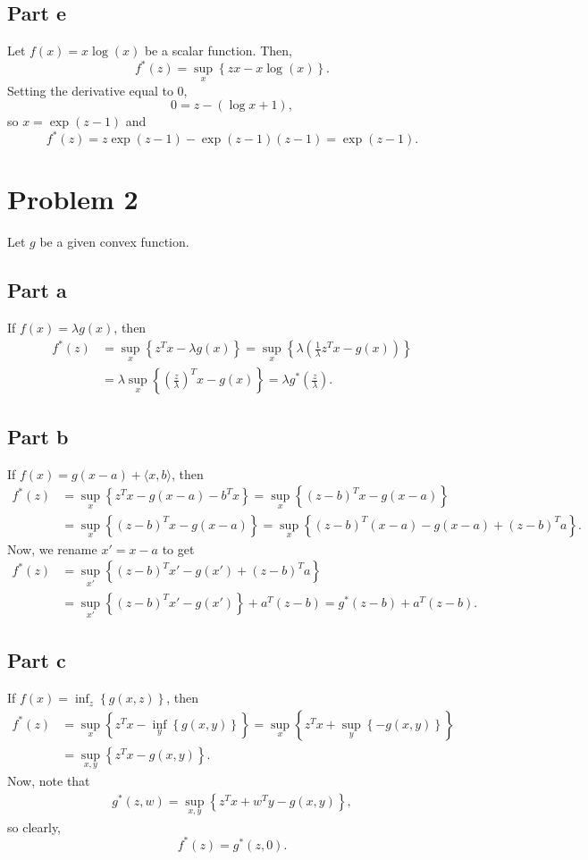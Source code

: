 \documentclass{article}
\begin{document}
\subsection{Part e}
Let $f(x) = x\log(x)$ be a scalar function. Then,
\[
f^*(z)=\sup_x \left\{ zx - x\log(x)\right\}.
\]
Setting the derivative equal to 0,
\[
0=z-(\log{x}+1),
\]
so $x=\exp(z-1)$ and
\[
f^*(z)=z\exp(z-1)-\exp(z-1)(z-1)=\exp(z-1).
\]

\section{Problem 2}
Let $g$ be a given convex function.
\subsection{Part a}
If $f(x)=\lambda g(x)$, then
\begin{align*}
f^*(z)&=\sup_x \left\{ z^Tx - \lambda g(x)\right\}=\sup_x \left\{ \lambda\left(\frac{1}{\lambda}z^Tx - g(x)\right)\right\}\\&=
\lambda\sup_x \left\{ \left(\frac{z}{\lambda}\right)^Tx - g(x)\right\}=\lambda g^*\left(\frac{z}{\lambda}\right).
\end{align*}

\subsection{Part b}
If $f(x) = g(x-a) + \langle x, b \rangle$, then
\begin{align*}
f^*(z)&=\sup_x \left\{ z^Tx - g(x-a) - b^Tx\right\}=\sup_x \left\{ (z-b)^Tx - g(x-a)\right\}\\&=
\sup_x \left\{ (z-b)^Tx - g(x-a)\right\}=\sup_x \left\{ (z-b)^T(x-a) - g(x-a)+(z-b)^Ta\right\}.
\end{align*}
Now, we rename $x'=x-a$ to get
\begin{align*}
f^*(z)&=\sup_{x'} \left\{ (z-b)^Tx' - g(x')+(z-b)^Ta\right\}\\&=
\sup_{x'} \left\{ (z-b)^Tx' - g(x')\right\}+a^T(z-b)=g^*(z-b)+a^T(z-b).
\end{align*}

\subsection{Part c}
If $f(x) = \inf_z \left\{g(x,z)\right\}$, then
\begin{align*}
f^*(z)&=\sup_x \left\{ z^Tx - \inf_y \left\{g(x,y)\right\}\right\}=\sup_x \left\{ z^Tx + \sup_y \left\{-g(x,y)\right\}\right\}\\&=
\sup_{x,y} \left\{ z^Tx -g(x,y)\right\}.
\end{align*}
Now, note that
\begin{align*}
g^*(z,w)=\sup_{x,y} \left\{ z^Tx+w^Ty -g(x,y)\right\},
\end{align*}
so clearly,
\[
f^*(z)=g^*(z,0).
\]
\end{document}

